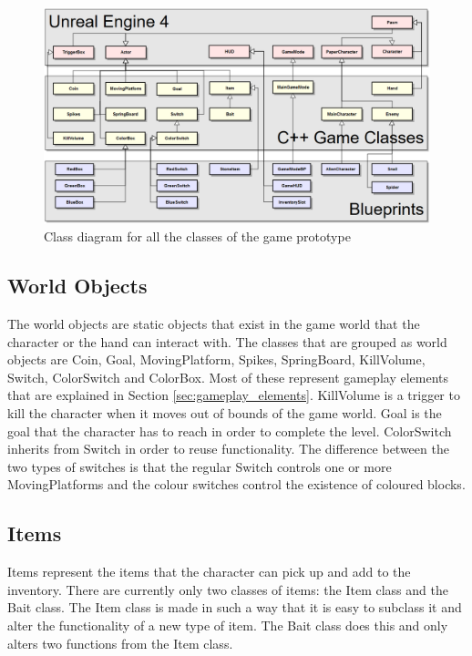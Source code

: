
\begin{figure}
	\includegraphics[width=\textwidth]{images/class_diagram_full}
	\caption{Class diagram for all the classes of the game prototype}
	\label{fig:class_diagram_full}
\end{figure}

\subsection{World Objects}
The world objects are static objects that exist in the game world that the character or the hand can interact with. The classes that are grouped as world objects are Coin, Goal, MovingPlatform, Spikes, SpringBoard, KillVolume, Switch, ColorSwitch and ColorBox. Most of these represent gameplay elements that are explained in Section \ref{sec:gameplay_elements}. KillVolume is a trigger to kill the character when it moves out of bounds of the game world. Goal is the goal that the character has to reach in order to complete the level. ColorSwitch inherits from Switch in order to reuse functionality. The difference between the two types of switches is that the regular Switch controls one or more MovingPlatforms and the colour switches control the existence of coloured blocks.

\subsection{Items}
Items represent the items that the character can pick up and add to the inventory. There are currently only two classes of items: the Item class and the Bait class. The Item class is made in such a way that it is easy to subclass it and alter the functionality of a new type of item. The Bait class does this and only alters two functions from the Item class.

